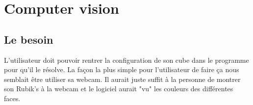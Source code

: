 \chapter{Computer vision}

\section{Le besoin}
L'utilisateur doit pouvoir rentrer la configuration de son cube dans le programme pour qu'il le résolve.
La façon la plus simple pour l'utilisateur de faire ça nous semblait être utiliser sa webcam.
Il aurait juste suffit à la personne de montrer son Rubik's à la webcam et le logiciel aurait "vu" les couleurs des différentes faces.
